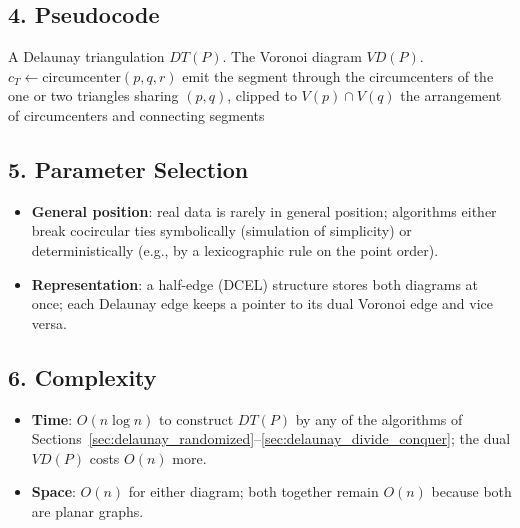 \subsection{4. Pseudocode}

\begin{algorithm}[htbp]
\caption{Voronoi Cells from a Delaunay Triangulation}
\label{alg:delaunay_to_voronoi}
\begin{algorithmic}[1]
\Require A Delaunay triangulation $DT(P)$.
\Ensure The Voronoi diagram $VD(P)$.
    \State $c_T \gets \text{circumcenter}(p,q,r)$
  \EndFor
    \State emit the segment through the circumcenters of the one or two
           triangles sharing $(p,q)$, clipped to $V(p) \cap V(q)$
  \EndFor
  \State \Return the arrangement of circumcenters and connecting segments
\EndFunction
\end{algorithmic}
\end{algorithm}

\subsection{5. Parameter Selection}

\begin{itemize}
\item \textbf{General position}: real data is rarely in general position;
  algorithms either break cocircular ties symbolically (simulation of
  simplicity) or deterministically (e.g., by a lexicographic rule on the
  point order).
\item \textbf{Representation}: a half-edge (DCEL) structure stores both
  diagrams at once; each Delaunay edge keeps a pointer to its dual Voronoi edge
  and vice versa.
\end{itemize}

\subsection{6. Complexity}

\begin{itemize}
\item \textbf{Time}: $O(n \log n)$ to construct $DT(P)$ by any of the algorithms
  of Sections~\ref{sec:delaunay_randomized}--\ref{sec:delaunay_divide_conquer};
  the dual $VD(P)$ costs $O(n)$ more.
\item \textbf{Space}: $O(n)$ for either diagram; both together remain $O(n)$
  because both are planar graphs.
\end{itemize}

